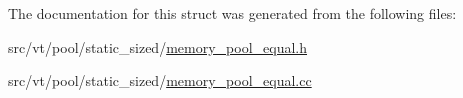 The documentation for this struct was generated from the following files\+:\begin{DoxyCompactItemize}
\item 
src/vt/pool/static\+\_\+sized/\hyperlink{memory__pool__equal_8h}{memory\+\_\+pool\+\_\+equal.\+h}\item 
src/vt/pool/static\+\_\+sized/\hyperlink{memory__pool__equal_8cc}{memory\+\_\+pool\+\_\+equal.\+cc}\end{DoxyCompactItemize}
